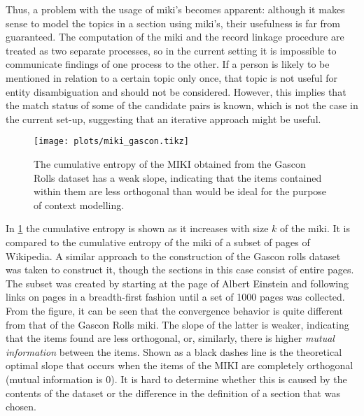 Thus, a problem with the usage of miki's becomes apparent: although it makes sense to model the topics in a section using miki's, their usefulness is far from guaranteed.
The computation of the miki and the record linkage procedure are treated as two separate processes, so in the current setting it is impossible to communicate findings of one process to the other.
If a person is likely to be mentioned in relation to a certain topic only once, that topic is not useful for entity disambiguation and should not be considered.
However, this implies that the match status of some of the candidate pairs is known, which is not the case in the current set-up, suggesting that an iterative approach might be useful.

\begin{figure}
    \centering
    \texttt{[image: plots/miki\_gascon.tikz]}
    \caption{The cumulative entropy of the MIKI obtained from the Gascon Rolls dataset has a weak slope, indicating that the items contained within them are less orthogonal than would be ideal for the purpose of context modelling.}
    \label{fig:gascon_convergence}
\end{figure}

In \cref{fig:gascon_convergence} the cumulative entropy is shown as it increases with size $k$ of the miki.
It is compared to the cumulative entropy of the miki of a subset of pages of Wikipedia.
A similar approach to the construction of the Gascon rolls dataset was taken to construct it, though the sections in this case consist of entire pages.
The subset was created by starting at the page of Albert Einstein and following links on pages in a breadth-first fashion until a set of \num{1000} pages was collected.
From the figure, it can be seen that the convergence behavior is quite different from that of the Gascon Rolls miki.
The slope of the latter is weaker, indicating that the items found are less orthogonal, or, similarly, there is higher \emph{mutual information} between the items.
Shown as a black dashes line is the theoretical optimal slope that occurs when the items of the MIKI are completely orthogonal (mutual information is $0$).
It is hard to determine whether this is caused by the contents of the dataset or the difference in the definition of a section that was chosen.

